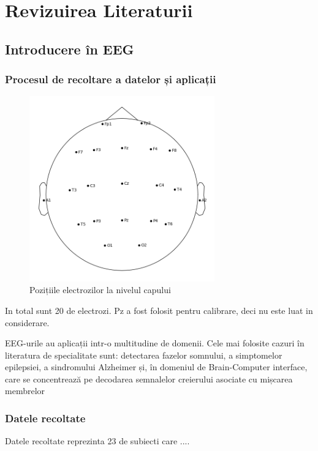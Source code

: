 \chapter{Revizuirea Literaturii}

\section{Introducere în EEG}
\subsection{Procesul de recoltare a datelor și aplicații}

\setlength{\abovecaptionskip}{0pt}
\setlength{\belowcaptionskip}{0pt}
\begin{figure}[h]
    \centering
    \includegraphics[width=8cm]{images/Sensor_positions_(eeg).png}
    \caption{Pozițiile electrozilor la nivelul capului}
    \label{fig:sensor_positions}
\end{figure}

In total sunt 20 de electrozi. Pz a fost folosit pentru calibrare, deci nu este luat in considerare.

EEG-urile au aplicații intr-o multitudine de domenii. Cele mai folosite cazuri în literatura de specialitate sunt: detectarea fazelor somnului, a simptomelor epilepsiei, a sindromului Alzheimer și, în domeniul de Brain-Computer interface, care se concentrează pe decodarea semnalelor creierului asociate cu mișcarea membrelor

\subsection{Datele recoltate}
Datele recoltate reprezinta 23 de subiecti care ....

